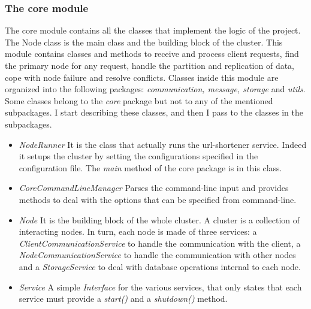 \documentclass{article}
\begin{document}
\subsubsection{The core module} 
The core module contains all the classes that implement the logic of the project. The Node class is the main class and the building block of the cluster. This module contains classes and methods to receive and process client requests, find the primary node for any request, handle the partition and replication of data, cope with node failure and resolve conflicts. Classes inside this module are organized into the following packages: \textit{communication, message, storage} and \textit{utils}. Some classes belong to the \textit{core} package but not to any of the mentioned subpackages. I start describing these classes, and then I pass to the classes in the subpackages. \\
\begin{itemize}
\item \textit{NodeRunner} It is the class that actually runs the url-shortener service. Indeed it setups the cluster by setting the configurations specified in the configuration file. The \textit{main} method of the core package is in this class.
\item \textit{CoreCommandLineManager} Parses the command-line input and provides methods to deal with the options that can be specified from command-line.
\item \textit{Node} It is the building block of the whole cluster. A cluster is a collection of interacting nodes. In turn, each node is made of three services: a \textit{ClientCommunicationService} to handle the communication with the client, a \textit{NodeCommunicationService} to handle the communication with other nodes and a \textit{StorageService} to deal with database operations internal to each node. 
\item \textit{Service} A simple \textit{Interface} for the various services, that only states that each service must provide a \textit{start()} and a \textit{shutdown()} method.
\end{itemize}
\end{document}
